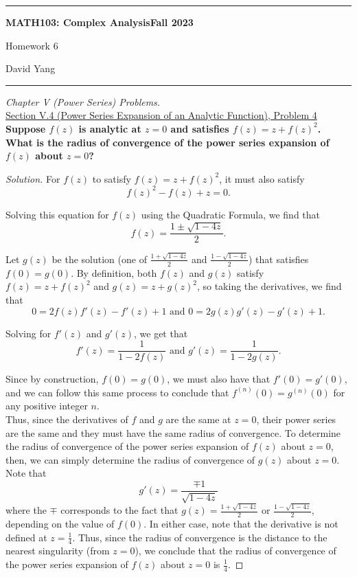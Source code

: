 \documentclass[11pt]{article}
\newenvironment{solution}
  {\renewcommand\qedsymbol{$\blacksquare$}\begin{proof}[Solution]}
  {\end{proof}}
\theoremstyle{definition}
\begin{document}
	\hrule
	\begin{center}
        \textbf{MATH103: Complex Analysis}\hfill \textbf{Fall 2023}\newline


		{\Large Homework 6}

		David Yang
	\end{center}

\hrule

\vspace{1em}


\textit{Chapter V (Power Series) Problems.} \\

\underline{Section V.4 (Power Series Expansion of an Analytic Function), Problem 4} \\

\textbf{Suppose $f(z)$ is analytic at $z = 0$ and satisfies $f(z) = z + f(z)^2$. What is the radius of convergence of the power series expansion of $f(z)$ about $z=0$?} 

\begin{solution}
For $f(z)$ to satisfy $f(z) = z + f(z)^2$, it must also satisfy \[f(z)^2 - f(z) + z =0.\]

Solving this equation for $f(z)$ using the Quadratic Formula, we find that
\[ f(z) = \frac{1 \pm \sqrt{1-4z}}{2}.\]

Let $g(z)$ be the solution (one of $\frac{1 + \sqrt{1-4z}}{2}$ and $\frac{1 - \sqrt{1-4z}}{2}$) that satisfies $f(0) = g(0)$. By definition, both $f(z)$ and $g(z)$ satisfy $f(z) = z + f(z)^2$ and $g(z) = z+g(z)^2$, so taking the derivatives, we find that
\[ 0 = 2f(z)f'(z) - f'(z) + 1 \text{ and } 0 = 2g(z)g'(z) - g'(z) + 1.\]

Solving for $f'(z)$ and $g'(z)$, we get that
\[ f'(z) = \frac{1}{1 - 2f(z)} \text{ and } g'(z) = \frac{1}{1 - 2g(z)}.\]

Since by construction, $f(0) = g(0)$, we must also have that $f'(0) = g'(0)$, and we can follow this same process to conclude that $f^{(n)}(0) = g^{(n)}(0)$ for any positive integer $n$. \\

Thus, since the derivatives of $f$ and $g$ are the same at $z=0$, their power series are the same and they must have the same radius of convergence. To determine the radius of convergence
of the power series expansion of $f(z)$ about $z=0$, then, we can simply determine the radius of convergence of $g(z)$ about $z=0$. \\

Note that \[g'(z) = \frac{\mp 1}{\sqrt{1-4z}}\]
where the $\mp$ corresponds to the fact that $g(z) = \frac{1 + \sqrt{1-4z}}{2}$ or $\frac{1 - \sqrt{1-4z}}{2}$, depending on the value of $f(0)$. In either case, note that the derivative is not defined
at $z = \frac{1}{4}$. Thus, since the radius of convergence is the distance to the nearest singularity (from $z=0$), we conclude that the radius of convergence of the power series expansion of $f(z)$ about $z=0$ is $\boxed{\frac{1}{4}}.$\end{solution}
\end{document}
